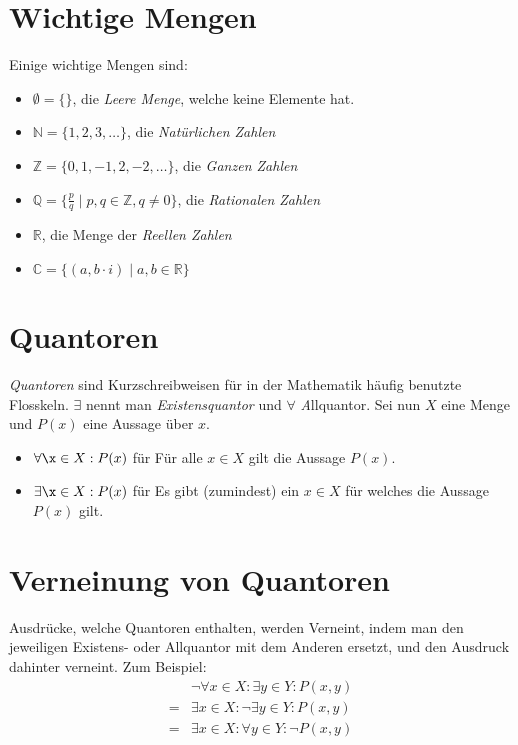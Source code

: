\documentclass{scrreprt}
\newcommand{\NN}{\mathbb{N}}
\newcommand{\ZZ}{\mathbb{Z}}
\newcommand{\QQ}{\mathbb{Q}}
\newcommand{\RR}{\mathbb{R}}
\newcommand{\CC}{\mathbb{C}}
\begin{document}
	\section{Wichtige Mengen}
		Einige wichtige Mengen sind:
		\begin{itemize}
			\item
				$\emptyset = \lbrace \rbrace$, die \emph{Leere Menge}, welche keine Elemente hat.
			\item
				$\NN = \lbrace 1, 2, 3, \dots \rbrace$, die \emph{Natürlichen Zahlen}
			\item
				$\ZZ = \lbrace 0, 1, -1, 2, -2, \dots \rbrace$, die \emph{Ganzen Zahlen}
			\item
				$\QQ = \lbrace \frac{p}{q} \mid p,q \in \ZZ, q \neq 0\rbrace$, die \emph{Rationalen Zahlen}
			\item
				$\RR$, die Menge der \emph{Reellen Zahlen}
			\item
				$\CC = \lbrace (a, b \cdot i) \mid a, b \in \RR \rbrace$
 		\end{itemize}

 	\section{Quantoren}
 	\emph{Quantoren} sind Kurzschreibweisen für in der Mathematik häufig benutzte Flosskeln. $\exists$ nennt man \emph{Existensquantor} und $\forall$ \emph Allquantor. Sei nun $X$ eine Menge und $P(x)$ eine Aussage über $x$.
 	\begin{itemize}
 		\item
 			$\forall \x \in X : P(x)$ für \glqq Für alle $x \in X$ gilt die Aussage $P(x)$.\grqq
 		\item
 			$\exists \x \in X : P(x)$ für \glqq Es gibt (zumindest) ein $x \in X$ für welches die Aussage $P(x)$ gilt.\grqq
 	\end{itemize}

 	\section{Verneinung von Quantoren}
 	Ausdrücke, welche Quantoren enthalten, werden Verneint, indem man den jeweiligen Existens- oder Allquantor mit dem Anderen ersetzt, und den Ausdruck dahinter verneint. Zum Beispiel:
 	\begin{align*}
 		& \neg \forall x \in X: \exists y \in Y : P (x,y)\\
 		=& \exists x \in X: \neg \exists y \in Y : P(x,y)\\
 		=& \exists x \in X: \forall y \in Y: \neg P(x,y)
 	\end{align*}
\end{document}
